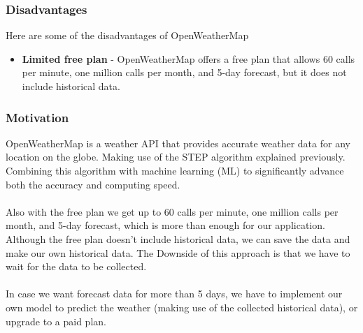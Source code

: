 \documentclass[../paper.tex]{subfiles}
\begin{document}
    \subsubsection{Disadvantages}
    Here are some of the disadvantages of OpenWeatherMap
    \begin{itemize}
        \item \textbf{Limited free plan} - OpenWeatherMap offers a free plan that allows 60 calls per minute, one million calls per month, and 5-day forecast, but it does not include historical data\cite{b1}.
    \end{itemize}

    \subsubsection{Motivation}
    OpenWeatherMap is a weather API that provides accurate weather data for any location on the globe.
    Making use of the STEP algorithm explained previously.
    Combining this algorithm with machine learning (ML) to significantly advance both the accuracy and computing speed.
    \\\\
    Also with the free plan we get up to 60 calls per minute, one million calls per month, and 5-day forecast, which is more than enough for our application.
    Although the free plan doesn't include historical data, we can save the data and make our own historical data.
    The Downside of this approach is that we have to wait for the data to be collected.
    \\\\
    In case we want forecast data for more than 5 days, we have to implement our own model to predict the weather (making use of the collected historical data), or upgrade to a paid plan.
\end{document}
